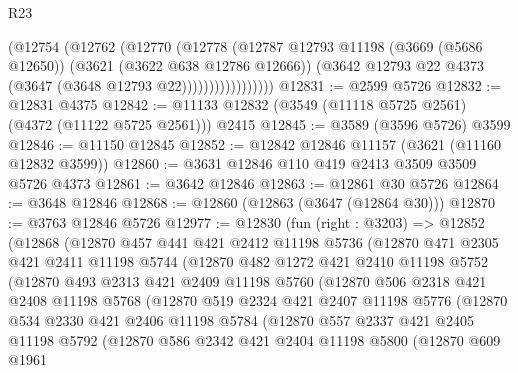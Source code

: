 \begin{lexlean}{R23}
\begin{coremodule}
                      (@12754
                        (@12762
                          (@12770
                            (@12778
                              (@12787
                                @12793
                                @11198
                                (@3669 (@5686 @12650))
                                (@3621 (@3622 @638 @12786 @12666))
                                (@3642 @12793 @22 @4373 (@3647 (@3648 @12793 @22)))))))))))))))))
@12831 := @2599 @5726
@12832 := @12831 @4375
@12842 := @11133 @12832 (@3549 (@11118 @5725 @2561) (@4372 (@11122 @5725 @2561))) @2415
@12845 := @3589 (@3596 @5726) @3599
@12846 := @11150 @12845
@12852 := @12842 @12846 @11157 (@3621 (@11160 @12832 @3599))
@12860 := @3631 @12846 @110 @419 @2413 @3509 @3509 @5726 @4373
@12861 := @3642 @12846
@12863 := @12861 @30 @5726
@12864 := @3648 @12846
@12868 := @12860 (@12863 (@3647 (@12864 @30)))
@12870 := @3763 @12846 @5726
@12977 := @12830
    (fun (right : @3203) =>
    @12852
      (@12868
        (@12870
          @457
          @441
          @421
          @2412
          @11198
          @5736
          (@12870
            @471
            @2305
            @421
            @2411
            @11198
            @5744
            (@12870
              @482
              @1272
              @421
              @2410
              @11198
              @5752
              (@12870
                @493
                @2313
                @421
                @2409
                @11198
                @5760
                (@12870
                  @506
                  @2318
                  @421
                  @2408
                  @11198
                  @5768
                  (@12870
                    @519
                    @2324
                    @421
                    @2407
                    @11198
                    @5776
                    (@12870
                      @534
                      @2330
                      @421
                      @2406
                      @11198
                      @5784
                      (@12870
                        @557
                        @2337
                        @421
                        @2405
                        @11198
                        @5792
                        (@12870
                          @586
                          @2342
                          @421
                          @2404
                          @11198
                          @5800
                          (@12870
                            @609
                            @1961

\end{coremodule}
\end{lexlean}
